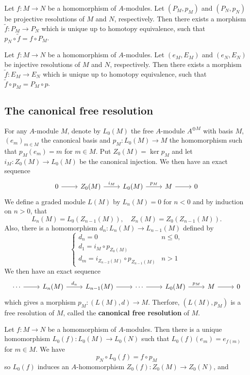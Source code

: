 \begin{proposition}
Let $f:M\to N$ be a homomorphism of $A$-modules. Let $(P_M,p_M)$ and $(P_N,p_N)$ be projective resolutions of $M$ and $N$, respectively. Then there exists a morphism $\tilde{f}:P_M\to P_N$ which is unique up to homotopy equivalence, such that $p_N\circ\tilde{f}=f\circ P_M$.
\end{proposition}
\begin{proposition}
Let $f:M\to N$ be a homomorphism of $A$-modules. Let $(e_M,E_M)$ and $(e_N,E_N)$ be injective resolutions of $M$ and $N$, respectively. Then there exists a morphism $\tilde{f}:E_M\to E_N$ which is unique up to homotopy equivalence, such that $\tilde{f}\circ p_M=P_M\circ p$.
\end{proposition}
\subsection{The canonical free resolution}
For any $A$-module $M$, denote by $L_0(M)$ the free $A$-module $A^{\oplus M}$ with basis $M$, $(e_m)_{m\in M}$ the canonical basis and $p_M:L_0(M)\to M$ the homomorphism such that $p_M(e_m)=m$ for $m\in M$. Put $Z_0(M)=\ker p_M$ and let $i_M:Z_0(M)\to L_0(M)$ be the canonical injection. We then have an exact sequence
\[\begin{tikzcd}
0\ar[r]&Z_0(M)\ar[r,"i_M"]&L_0(M)\ar[r,"p_M"]&M\ar[r]&0
\end{tikzcd}\]
We define a graded module $L(M)$ by $L_n(M)=0$ for $n<0$ and by induction on $n>0$, that
\[L_n(M)=L_0(Z_{n-1}(M)),\quad Z_n(M)=Z_0(Z_{n-1}(M)).\]
Also, there is a homomorphism $d_n:L_n(M)\to L_{n-1}(M)$ defined by
\[\begin{cases}
d_n=0&n\leq 0,\\
d_1=i_M\circ p_{Z_0(M)}&\\
d_m=i_{Z_{n-2}(M)}\circ p_{Z_{n-1}(M)}&n>1
\end{cases}\]
We then have an exact sequence
\[\begin{tikzcd}
\cdots\ar[r]&L_n(M)\ar[r,"d_n"]&L_{n-1}(M)\ar[r]&\cdots\ar[r]&L_0(M)\ar[r,"p_M"]&M\ar[r]&0
\end{tikzcd}\]
which gives a morphism $p_M:(L(M),d)\to M$. Therfore, $(L(M),p_M)$ is a free resolution of $M$, called the \textbf{canonical free resolution} of $M$.\par
Let $f:M\to N$ be a homomorphism of $A$-modules. Then there is a unique homomorphism $L_0(f):L_0(M)\to L_0(N)$ such that $L_0(f)(e_m)=e_{f(m)}$ for $m\in M$. We have
\[p_N\circ L_0(f)=f\circ p_M\]
so $L_0(f)$ induces an $A$-homomorphism $Z_0(f):Z_0(M)\to Z_0(N)$, and
